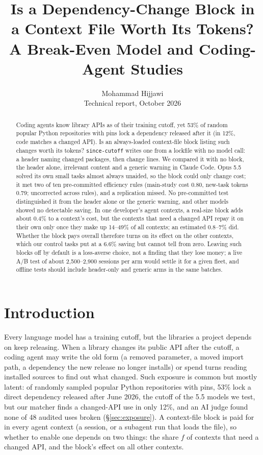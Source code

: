 \documentclass[11pt]{article}
\title{Is a Dependency-Change Block in a Context File Worth Its Tokens?\\A Break-Even Model and Coding-Agent Studies}
\author{Mohammad Hijjawi \\ Technical report, October 2026 \\ \repo}
\newcommand{\tool}{\texttt{since-cutoff}\xspace}
\begin{document}
\maketitle

\begin{abstract}
Coding agents know library APIs as of their training cutoff, yet 53\% of random popular Python repositories with pins lock a dependency released after it (in 12\%, code matches a changed API).
Is an always-loaded context-file block listing such changes worth its tokens?
\tool writes one from a lockfile with no model call: a header naming changed packages, then change lines.
We compared it with no block, the header alone, irrelevant content and a generic warning in Claude Code.
Opus 5.5 solved its own small tasks almost always unaided, so the block could only change cost; it met two of ten pre-committed efficiency rules (main-study cost 0.80, new-task tokens 0.79; uncorrected across rules), and a replication missed.
No pre-committed test distinguished it from the header alone or the generic warning, and other models showed no detectable saving.
In one developer's agent contexts, a real-size block adds about 0.4\% to a context's cost, but the contexts that need a changed API repay it on their own only once they make up 14--49\% of all contexts; an estimated 0.8--7\% did.
Whether the block pays overall therefore turns on its effect on the other contexts, which our control tasks put at a 6.6\% saving but cannot tell from zero.
Leaving such blocks off by default is a loss-averse choice, not a finding that they lose money; a live A/B test of about 2,500--2,900 sessions per arm would settle it for a given fleet, and offline tests should include header-only and generic arms in the same batches.
\end{abstract}

\section{Introduction}

Every language model has a training cutoff, but the libraries a project depends on keep releasing.
When a library changes its public API after the cutoff, a coding agent may write the old form (a removed parameter, a moved import path, a dependency the new release no longer installs) or spend turns reading installed sources to find out what changed.
Such exposure is common but mostly latent: of randomly sampled popular Python repositories with pins, 53\% lock a direct dependency released after June 2026, the cutoff of the 5.5 models we test, but our matcher finds a changed-API use in only 12\%, and an AI judge found none of 48 audited uses broken (\S\ref{sec:exposure}).
A context-file block is paid for in every agent context (a session, or a subagent run that loads the file), so whether to enable one depends on two things: the share $f$ of contexts that need a changed API, and the block's effect on all other contexts.
\end{document}
